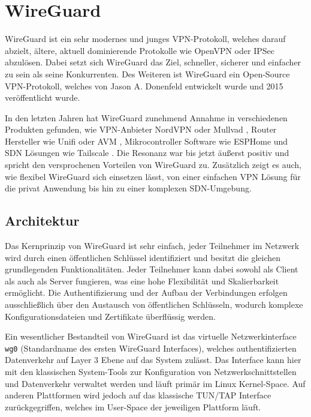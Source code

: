 \section{WireGuard} \label{wireguard}

WireGuard ist ein sehr modernes und junges VPN-Protokoll, welches darauf abzielt, ältere, aktuell dominierende Protokolle wie OpenVPN oder IPSec abzulösen. Dabei setzt sich WireGuard das Ziel, schneller, sicherer und einfacher zu sein als seine Konkurrenten. Des Weiteren ist WireGuard ein Open-Source \gls{VPN}-Protokoll, welches von Jason A. Donenfeld entwickelt wurde und 2015 veröffentlicht wurde. \cite{Wireguard_Whitepaper, Wireguard_Presentations}

In den letzten Jahren hat WireGuard zunehmend Annahme in verschiedenen Produkten gefunden, wie VPN-Anbieter NordVPN \cite{NordLynx} oder Mullvad \cite{Mullvad_Wireguard}, Router Hersteller wie Unifi \cite{Unifi_Wireguard} oder AVM \cite{AVM_Wireguard}, Mikrocontroller Software wie ESPHome \cite{ESPHome_Wireguard} und \acrfull{SDN} Lösungen wie Tailscale \cite{Tailscale}. Die Resonanz war bis jetzt äußerst positiv und spricht den versprochenen Vorteilen von WireGuard zu. Zusätzlich zeigt es auch, wie flexibel WireGuard sich einsetzen lässt, von einer einfachen VPN Lösung für die privat Anwendung bis hin zu einer komplexen \gls{SDN}-Umgebung.

\subsection{Architektur}

Das Kernprinzip von WireGuard ist sehr einfach, jeder Teilnehmer im Netzwerk wird durch einen öffentlichen Schlüssel identifiziert und besitzt die gleichen grundlegenden Funktionalitäten. Jeder Teilnehmer kann dabei sowohl als Client als auch als Server fungieren, was eine hohe Flexibilität und Skalierbarkeit ermöglicht. Die Authentifizierung und der Aufbau der Verbindungen erfolgen ausschließlich über den Austausch von öffentlichen Schlüsseln, wodurch komplexe Konfigurationsdateien und Zertifikate überflüssig werden.

Ein wesentlicher Bestandteil von WireGuard ist das virtuelle Netzwerkinterface \texttt{wg0} (Standardname des ersten WireGuard Interfaces), welches authentifizierten Datenverkehr auf Layer 3 Ebene auf das System zulässt. Das Interface kann hier mit den klassischen System-Tools zur Konfiguration von Netzwerkschnittstellen und Datenverkehr verwaltet werden und läuft primär im Linux Kernel-Space. Auf anderen Plattformen wird jedoch auf das klassische TUN/TAP Interface zurückgegriffen, welches im User-Space der jeweiligen Plattform läuft. \cite{Wireguard_Whitepaper, Wireguard_cross_platform}

